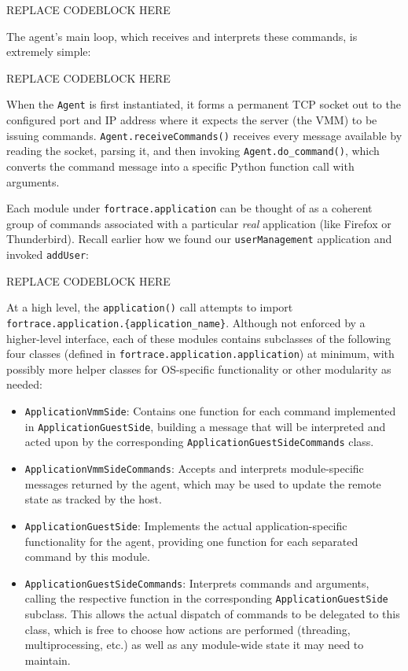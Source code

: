 REPLACE CODEBLOCK HERE

The agent's main loop, which receives and interprets these commands, is
extremely simple:

REPLACE CODEBLOCK HERE

When the \texttt{Agent} is first instantiated, it forms a permanent TCP
socket out to the configured port and IP address where it expects the
server (the VMM) to be issuing commands.
\texttt{Agent.receiveCommands()} receives every message available by
reading the socket, parsing it, and then invoking
\texttt{Agent.do\_command()}, which converts the command message into a
specific Python function call with arguments.

Each module under \texttt{fortrace.application} can be thought of as a
coherent group of commands associated with a particular \emph{real}
application (like Firefox or Thunderbird). Recall earlier how we found
our \texttt{userManagement} application and invoked \texttt{addUser}:

REPLACE CODEBLOCK HERE

At a high level, the \texttt{application()} call attempts to import
\texttt{fortrace.application.\{application\_name\}}. Although not
enforced by a higher-level interface, each of these modules contains
subclasses of the following four classes (defined in
\texttt{fortrace.application.application}) at minimum, with possibly
more helper classes for OS-specific functionality or other modularity as
needed:

\begin{itemize}
\tightlist
\item
  \texttt{ApplicationVmmSide}: Contains one function for each command
  implemented in \texttt{ApplicationGuestSide}, building a message that
  will be interpreted and acted upon by the corresponding
  \texttt{ApplicationGuestSideCommands} class.
\item
  \texttt{ApplicationVmmSideCommands}: Accepts and interprets
  module-specific messages returned by the agent, which may be used to
  update the remote state as tracked by the host.
\item
  \texttt{ApplicationGuestSide}: Implements the actual
  application-specific functionality for the agent, providing one
  function for each separated command by this module.
\item
  \texttt{ApplicationGuestSideCommands}: Interprets commands and
  arguments, calling the respective function in the corresponding
  \texttt{ApplicationGuestSide} subclass. This allows the actual
  dispatch of commands to be delegated to this class, which is free to
  choose how actions are performed (threading, multiprocessing, etc.) as
  well as any module-wide state it may need to maintain.
\end{itemize}

